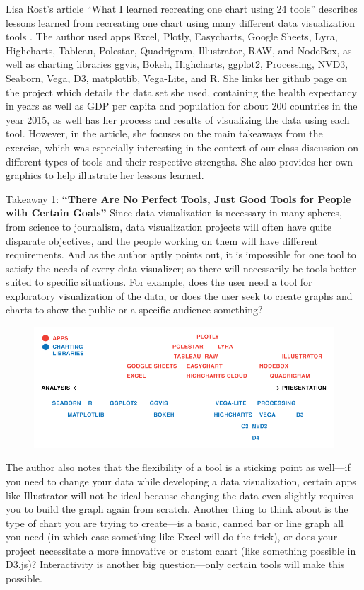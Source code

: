 \documentclass[]{book}
\theoremstyle{definition}
\theoremstyle{definition}
\theoremstyle{definition}
\theoremstyle{remark}
\begin{document}
Lisa Rost's article ``What I learned recreating one chart using 24
tools'' describes lessons learned from recreating one chart using many
different data visualization tools \citep{different_tools}. The author
used apps Excel, Plotly, Easycharts, Google Sheets, Lyra, Highcharts,
Tableau, Polestar, Quadrigram, Illustrator, RAW, and NodeBox, as well as
charting libraries ggvis, Bokeh, Highcharts, ggplot2, Processing, NVD3,
Seaborn, Vega, D3, matplotlib, Vega-Lite, and R. She links her github
page on the project which details the data set she used, containing the
health expectancy in years as well as GDP per capita and population for
about 200 countries in the year 2015, as well has her process and
results of visualizing the data using each tool. However, in the
article, she focuses on the main takeaways from the exercise, which was
especially interesting in the context of our class discussion on
different types of tools and their respective strengths. She also
provides her own graphics to help illustrate her lessons learned.

Takeaway 1: \textbf{``There Are No Perfect Tools, Just Good Tools for
People with Certain Goals''} Since data visualization is necessary in
many spheres, from science to journalism, data visualization projects
will often have quite disparate objectives, and the people working on
them will have different requirements. And as the author aptly points
out, it is impossible for one tool to satisfy the needs of every data
visualizer; so there will necessarily be tools better suited to specific
situations. For example, does the user need a tool for exploratory
visualization of the data, or does the user seek to create graphs and
charts to show the public or a specific audience something?

\begin{figure}
\centering
\includegraphics{images/analysis_spectrum.png}
\caption{}
\end{figure}

The author also notes that the flexibility of a tool is a sticking point
as well---if you need to change your data while developing a data
visualization, certain apps like Illustrator will not be ideal because
changing the data even slightly requires you to build the graph again
from scratch. Another thing to think about is the type of chart you are
trying to create---is a basic, canned bar or line graph all you need (in
which case something like Excel will do the trick), or does your project
necessitate a more innovative or custom chart (like something possible
in D3.js)? Interactivity is another big question---only certain tools
will make this possible.
\end{document}
